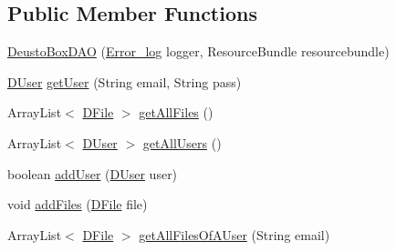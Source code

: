 \subsection*{Public Member Functions}
\begin{DoxyCompactItemize}
\item 
\mbox{\hyperlink{classes_1_1deusto_1_1bspq18_1_1e6_1_1_deusto_box_1_1_server_1_1jdo_1_1dao_1_1_deusto_box_d_a_o_aa34df1a85684509c3bad297ab022128e}{Deusto\+Box\+D\+AO}} (\mbox{\hyperlink{classes_1_1deusto_1_1bspq18_1_1e6_1_1_deusto_box_1_1_server_1_1utils_1_1_error__log}{Error\+\_\+log}} logger, Resource\+Bundle resourcebundle)
\item 
\mbox{\hyperlink{classes_1_1deusto_1_1bspq18_1_1e6_1_1_deusto_box_1_1_server_1_1jdo_1_1data_1_1_d_user}{D\+User}} \mbox{\hyperlink{classes_1_1deusto_1_1bspq18_1_1e6_1_1_deusto_box_1_1_server_1_1jdo_1_1dao_1_1_deusto_box_d_a_o_ad7a2019d707d5698bdb80f4fc7df9248}{get\+User}} (String email, String pass)
\item 
Array\+List$<$ \mbox{\hyperlink{classes_1_1deusto_1_1bspq18_1_1e6_1_1_deusto_box_1_1_server_1_1jdo_1_1data_1_1_d_file}{D\+File}} $>$ \mbox{\hyperlink{classes_1_1deusto_1_1bspq18_1_1e6_1_1_deusto_box_1_1_server_1_1jdo_1_1dao_1_1_deusto_box_d_a_o_afe1ece43464200c0c300f3eac92d728e}{get\+All\+Files}} ()
\item 
Array\+List$<$ \mbox{\hyperlink{classes_1_1deusto_1_1bspq18_1_1e6_1_1_deusto_box_1_1_server_1_1jdo_1_1data_1_1_d_user}{D\+User}} $>$ \mbox{\hyperlink{classes_1_1deusto_1_1bspq18_1_1e6_1_1_deusto_box_1_1_server_1_1jdo_1_1dao_1_1_deusto_box_d_a_o_af6a98ee487f66dcbc56663226d7ce425}{get\+All\+Users}} ()
\item 
boolean \mbox{\hyperlink{classes_1_1deusto_1_1bspq18_1_1e6_1_1_deusto_box_1_1_server_1_1jdo_1_1dao_1_1_deusto_box_d_a_o_a4873b92825ffdb620162f77cbb23b8d7}{add\+User}} (\mbox{\hyperlink{classes_1_1deusto_1_1bspq18_1_1e6_1_1_deusto_box_1_1_server_1_1jdo_1_1data_1_1_d_user}{D\+User}} user)
\item 
void \mbox{\hyperlink{classes_1_1deusto_1_1bspq18_1_1e6_1_1_deusto_box_1_1_server_1_1jdo_1_1dao_1_1_deusto_box_d_a_o_aa1b57d294990a7f260c204444d6f25c7}{add\+Files}} (\mbox{\hyperlink{classes_1_1deusto_1_1bspq18_1_1e6_1_1_deusto_box_1_1_server_1_1jdo_1_1data_1_1_d_file}{D\+File}} file)
\item 
Array\+List$<$ \mbox{\hyperlink{classes_1_1deusto_1_1bspq18_1_1e6_1_1_deusto_box_1_1_server_1_1jdo_1_1data_1_1_d_file}{D\+File}} $>$ \mbox{\hyperlink{classes_1_1deusto_1_1bspq18_1_1e6_1_1_deusto_box_1_1_server_1_1jdo_1_1dao_1_1_deusto_box_d_a_o_a1f838db8a746072ab5b426ff5c1448da}{get\+All\+Files\+Of\+A\+User}} (String email)

\end{DoxyCompactItemize}
